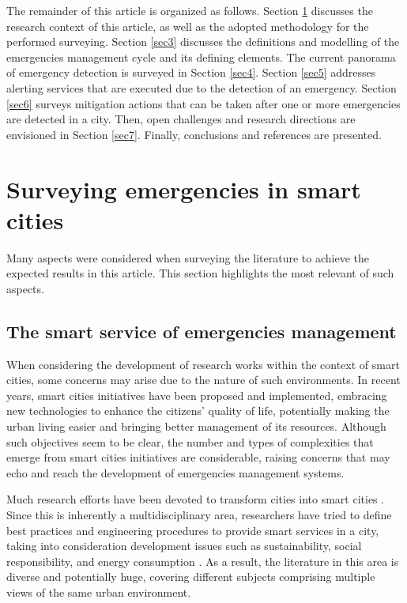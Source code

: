 \begin{refsection}
The remainder of this article is organized as follows. Section \ref{sec2} discusses the research context of this article, as well as the adopted methodology for the performed surveying. Section \ref{sec3} discusses the definitions and modelling of the emergencies management cycle and its defining elements. The current panorama of emergency detection is surveyed in Section \ref{sec4}. Section \ref{sec5} addresses alerting services that are executed due to the detection of an emergency. Section \ref{sec6} surveys mitigation actions that can be taken after one or more emergencies are detected in a city. Then, open challenges and research directions are envisioned in Section \ref{sec7}. Finally, conclusions and references are presented.

\section{Surveying emergencies in smart cities}\label{sec2}

Many aspects were considered when surveying the literature to achieve the expected results in this article. This section highlights the most relevant of such aspects.

\subsection{The smart service of emergencies management}

When considering the development of research works within the context of smart cities, some concerns may arise due to the nature of such environments. In recent years, smart cities initiatives have been proposed and implemented, embracing new technologies to enhance the citizens' quality of life, potentially making the urban living easier and bringing better management of its resources. Although such objectives seem to be clear, the number and types of complexities that emerge from smart cities initiatives are considerable, raising concerns that may echo and reach the development of emergencies management systems.

Much research efforts have been devoted to transform cities into smart cities \cite{citiestransforming,smartstrategy}. Since this is inherently a multidisciplinary area, researchers have tried to define best practices and engineering procedures to provide smart services in a city, taking into consideration development issues such as sustainability, social responsibility, and energy consumption \cite{citiestransforming2}. As a result, the literature in this area is diverse and potentially huge, covering different subjects comprising multiple views of the same urban environment.


\end{refsection}
